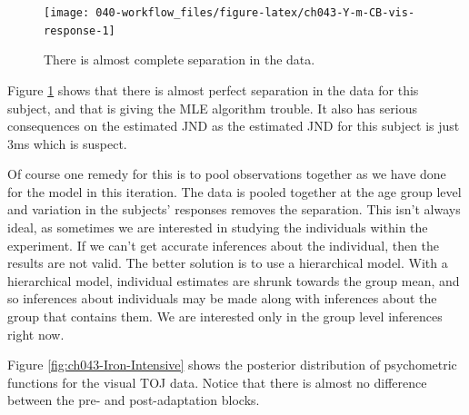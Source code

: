\documentclass[11pt, oneside, openany]{scrbook}
\begin{document}
\begin{figure}

{\centering \texttt{[image: 040-workflow\_files/figure-latex/ch043-Y-m-CB-vis-response-1]} 

}

\caption{There is almost complete separation in the data.}\label{fig:ch043-Y-m-CB-vis-response}
\end{figure}

Figure \ref{fig:ch043-Y-m-CB-vis-response} shows that there is almost perfect separation in the data for this subject, and that is giving the MLE algorithm trouble. It also has serious consequences on the estimated JND as the estimated JND for this subject is just 3ms which is suspect.

Of course one remedy for this is to pool observations together as we have done for the model in this iteration. The data is pooled together at the age group level and variation in the subjects' responses removes the separation. This isn't always ideal, as sometimes we are interested in studying the individuals within the experiment. If we can't get accurate inferences about the individual, then the results are not valid. The better solution is to use a hierarchical model. With a hierarchical model, individual estimates are shrunk towards the group mean, and so inferences about individuals may be made along with inferences about the group that contains them. We are interested only in the group level inferences right now.

Figure \ref{fig:ch043-Iron-Intensive} shows the posterior distribution of psychometric functions for the visual TOJ data. Notice that there is almost no difference between the pre- and post-adaptation blocks.
\end{document}
